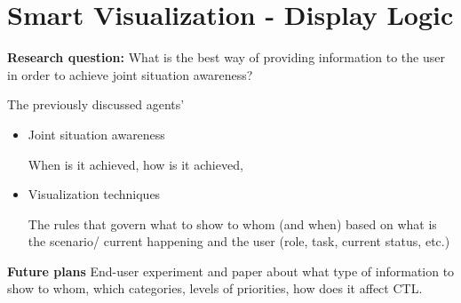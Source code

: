 \chapter{Smart Visualization - Display Logic}

\textbf{Research question:} What is the best way of providing information to the user in order to achieve joint situation awareness? 

The previously discussed agents' 
  \begin{itemize}
  
\item Joint situation awareness

When is it achieved, how is it achieved,

\item Visualization techniques

The rules that govern what to show to whom (and when) based on what is the scenario/ current happening and the user (role, task, current status, etc.) 
\end{itemize}
  
\textbf{Future plans} End-user experiment and paper about what type of information to show to whom, which categories, levels of priorities, how does it affect CTL.
  
  
  